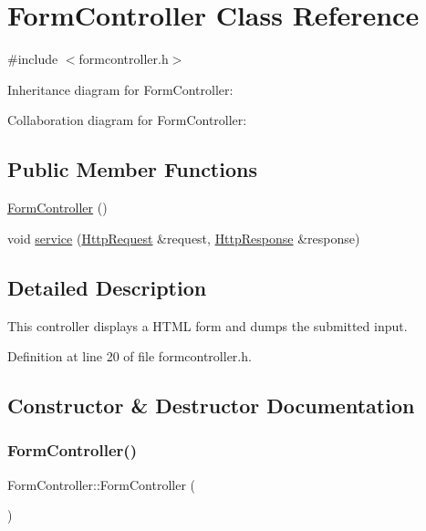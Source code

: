 \hypertarget{class_form_controller}{}\section{Form\+Controller Class Reference}
\label{class_form_controller}


{\ttfamily \#include $<$formcontroller.\+h$>$}



Inheritance diagram for Form\+Controller\+:


Collaboration diagram for Form\+Controller\+:
\subsection*{Public Member Functions}
\begin{DoxyCompactItemize}
\item 
\mbox{\hyperlink{class_form_controller_a5b7400b341aacac9476b62ef188ff9f5}{Form\+Controller}} ()
\item 
void \mbox{\hyperlink{class_form_controller_af327951d82e5b89df6e006c370540b7a}{service}} (\mbox{\hyperlink{classstefanfrings_1_1_http_request}{Http\+Request}} \&request, \mbox{\hyperlink{classstefanfrings_1_1_http_response}{Http\+Response}} \&response)
\end{DoxyCompactItemize}


\subsection{Detailed Description}
This controller displays a H\+T\+ML form and dumps the submitted input. 

Definition at line 20 of file formcontroller.\+h.



\subsection{Constructor \& Destructor Documentation}
\mbox{\label{class_form_controller_a5b7400b341aacac9476b62ef188ff9f5}} 
\subsubsection{\texorpdfstring{Form\+Controller()}{FormController()}}
{\footnotesize\ttfamily Form\+Controller\+::\+Form\+Controller (\begin{DoxyParamCaption}{ }\end{DoxyParamCaption})}


